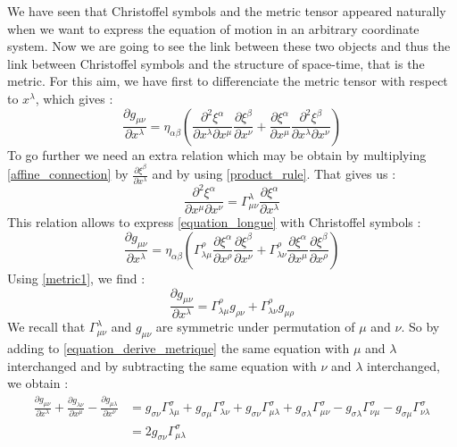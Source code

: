 We have seen that Christoffel symbols and the metric tensor appeared naturally when we want to
express the equation of motion in an arbitrary coordinate system. Now we are going to see the
link between these two objects and thus the link between Christoffel symbols and the
structure of space-time, that is the metric.
For this aim, we have first to differenciate the metric tensor with respect to $x^\lambda$,
which gives :
%
\begin{equation}\label{equation_longue}
	\frac{\partial g_{\mu\nu}}{\partial x^\lambda} = 
	\eta_{\alpha\beta}\left(\frac{\partial^2 \xi^\alpha}{\partial x^\lambda\partial x^\mu}
	\frac{\partial \xi^\beta}{\partial x^\nu} +
	\frac{\partial \xi^\alpha}
	{\partial x^\mu}\frac{\partial^2\xi^\beta}{\partial x^\lambda \partial x^\nu}\right)
\end{equation}
%
To go further we need an extra relation which may be obtain by multiplying
\eqref{affine_connection} by $\frac{\partial \xi^\beta}{\partial x^\lambda}$ and by using
\eqref{product_rule}. That gives us :
%
\begin{equation}
	\frac{\partial^2 \xi^\alpha}{\partial x^\mu \partial x^\nu}
	= \Gamma^\lambda_{\mu\nu} \frac{\partial \xi^\alpha}{\partial x^\lambda}
\end{equation}
%
This relation allows to express \eqref{equation_longue} with Christoffel symbols :
%
\begin{equation}
	\frac{\partial g_{\mu\nu}}{\partial x^\lambda} = 
	\eta_{\alpha\beta}\left(\Gamma^\rho_{\lambda\mu}
	\frac{\partial\xi^\alpha}{\partial x^\rho}
	\frac{\partial \xi^\beta}{\partial x^\nu} + \Gamma^\rho_{\lambda\nu}
	\frac{\partial\xi^\alpha}{\partial x^\mu}
	\frac{\partial \xi^\beta}{\partial x^\rho}\right)
\end{equation}
%
Using \eqref{metric1}, we find :
%
\begin{equation}\label{equation_derive_metrique}
	\frac{\partial g_{\mu\nu}}{\partial x^\lambda} =
	\Gamma^\rho_{\lambda\mu}g_{\rho\nu} + \Gamma^\rho_{\lambda\nu}g_{\mu\rho}
\end{equation}
%
We recall that $\Gamma^\lambda_{\mu\nu}$ and $g_{\mu\nu}$ are symmetric under permutation of
$\mu$ and $\nu$. So by adding to \eqref{equation_derive_metrique} the same equation with
$\mu$ and $\lambda$ interchanged and by subtracting the same equation with $\nu$ and
$\lambda$ interchanged, we obtain :
%
\begin{equation}
\begin{aligned}
	\frac{\partial g_{\mu\nu}}{\partial x^\lambda}
	+ \frac{\partial g_{\lambda\nu}}{\partial x^\mu}
	- \frac{\partial g_{\mu\lambda}}{\partial x^\nu}
	& = g_{\sigma\nu} \Gamma^\sigma_{\lambda\mu} 
	+ g_{\sigma\mu} \Gamma^\sigma_{\lambda\nu} 
	+ g_{\sigma\nu} \Gamma^\sigma_{\mu\lambda} 
	+ g_{\sigma\lambda} \Gamma^\sigma_{\mu\nu} 
	- g_{\sigma\lambda} \Gamma^\sigma_{\nu\mu} 
	- g_{\sigma\mu} \Gamma^\sigma_{\nu\lambda} \\
	& = 2g_{\sigma\nu}\Gamma^\sigma_{\mu\lambda}
\end{aligned}
\end{equation}
